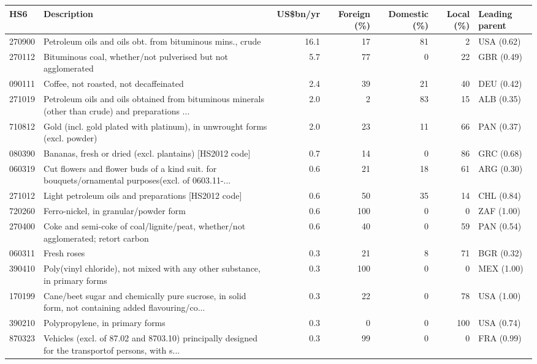 \begin{tabular}{@{}l p{6.4cm} r r r r l@{}}
\toprule
HS6 & Description & US\$bn/yr & Foreign (\%) & Domestic (\%) & Local (\%) & Leading parent \\
\midrule
270900 & Petroleum oils and oils obt. from bituminous mins., crude & 16.1 & 17 & 81 & 2 & USA (0.62) \\
270112 & Bituminous coal, whether/\allowbreak{}not pulverised but not agglomerated & 5.7 & 77 & 0 & 22 & GBR (0.49) \\
090111 & Coffee, not roasted, not decaffeinated & 2.4 & 39 & 21 & 40 & DEU (0.42) \\
271019 & Petroleum oils and oils obtained from bituminous minerals (other than crude) and preparations ... & 2.0 & 2 & 83 & 15 & ALB (0.35) \\
710812 & Gold (incl. gold plated with platinum), in unwrought forms (excl. powder) & 2.0 & 23 & 11 & 66 & PAN (0.37) \\
080390 & Bananas, fresh or dried (excl. plantains) [HS2012 code] & 0.7 & 14 & 0 & 86 & GRC (0.68) \\
060319 & Cut flowers and flower buds of a kind suit. for bouquets/\allowbreak{}ornamental purposes(excl. of 0603.11-... & 0.6 & 21 & 18 & 61 & ARG (0.30) \\
271012 & Light petroleum oils and preparations [HS2012 code] & 0.6 & 50 & 35 & 14 & CHL (0.84) \\
720260 & Ferro-nickel, in granular/\allowbreak{}powder form & 0.6 & 100 & 0 & 0 & ZAF (1.00) \\
270400 & Coke and semi-coke of coal/\allowbreak{}lignite/\allowbreak{}peat, whether/\allowbreak{}not agglomerated; retort carbon & 0.6 & 40 & 0 & 59 & PAN (0.54) \\
060311 & Fresh roses & 0.3 & 21 & 8 & 71 & BGR (0.32) \\
390410 & Poly(vinyl chloride), not mixed with any other substance, in primary forms & 0.3 & 100 & 0 & 0 & MEX (1.00) \\
170199 & Cane/\allowbreak{}beet sugar and chemically pure sucrose, in solid form, not containing added flavouring/\allowbreak{}co... & 0.3 & 22 & 0 & 78 & USA (1.00) \\
390210 & Polypropylene, in primary forms & 0.3 & 0 & 0 & 100 & USA (0.74) \\
870323 & Vehicles (excl. of 87.02 and 8703.10) principally designed for the transportof persons, with s... & 0.3 & 99 & 0 & 0 & FRA (0.99) \\
\bottomrule
\end{tabular}
